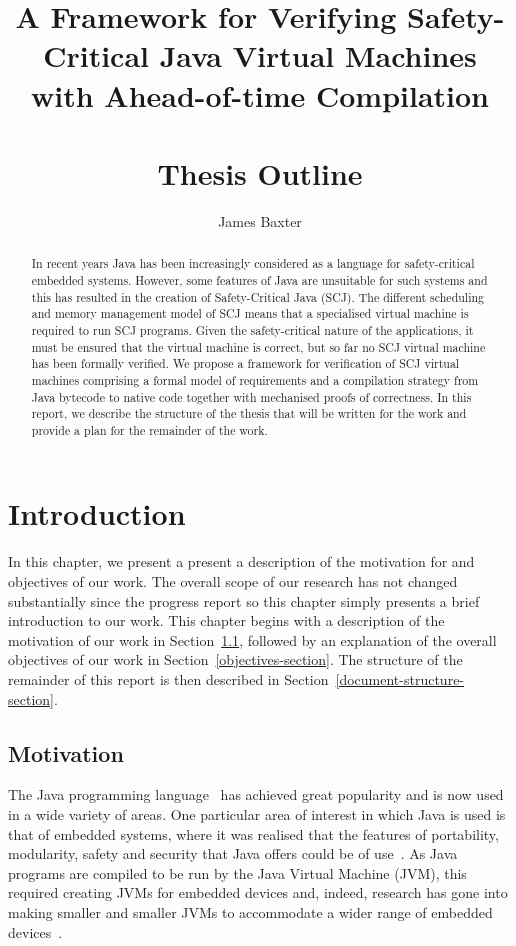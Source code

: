 \documentclass[a4paper,10pt]{report}
\title{A Framework for Verifying Safety-Critical Java Virtual Machines
with Ahead-of-time Compilation \\ \hfill \\
\Large Thesis Outline}
\author{James Baxter}
\date{}
\begin{document}
\maketitle

\begin{abstract}
  In recent years Java has been increasingly considered as a language
  for safety-critical embedded systems.
  However, some features of Java are unsuitable for such systems and
  this has resulted in the creation of Safety-Critical Java (SCJ).
  The different scheduling and memory management model of SCJ means
  that a specialised virtual machine is required to run SCJ programs.
  Given the safety-critical nature of the applications, it must be
  ensured that the virtual machine is correct, but so far no SCJ
  virtual machine has been formally verified.
  We propose a framework for verification of SCJ virtual machines
  comprising a formal model of requirements and a compilation strategy
  from Java bytecode to native code together with mechanised proofs of
  correctness.
  In this report, we describe the structure of the thesis that will be
  written for the work and provide a plan for the remainder of the
  work.
\end{abstract}

\tableofcontents

\chapter{Introduction}

In this chapter, we present a present a description of the motivation
for and objectives of our work.
The overall scope of our research has not changed substantially since
the progress report so this chapter simply presents a brief
introduction to our work.
This chapter begins with a description of the motivation of our work
in Section~\ref{motivation-section}, followed by an explanation of the
overall objectives of our work in Section~\ref{objectives-section}.
The structure of the remainder of this report is then described in
Section~\ref{document-structure-section}.


\section{Motivation}
\label{motivation-section}

The Java programming language~\cite{gosling2013} has achieved great
popularity and is now used in a wide variety of areas.
One particular area of interest in which Java is used is that of
embedded systems, where it was realised that the features of
portability, modularity, safety and security that Java offers could be
of use~\cite{mulchandani1998}.
As Java programs are compiled to be run by the Java Virtual Machine
(JVM), this required creating JVMs for embedded devices and, indeed,
research has gone into making smaller and smaller JVMs to accommodate
a wider range of embedded devices~\cite{caska2011,thomm2010}.
\end{document}

